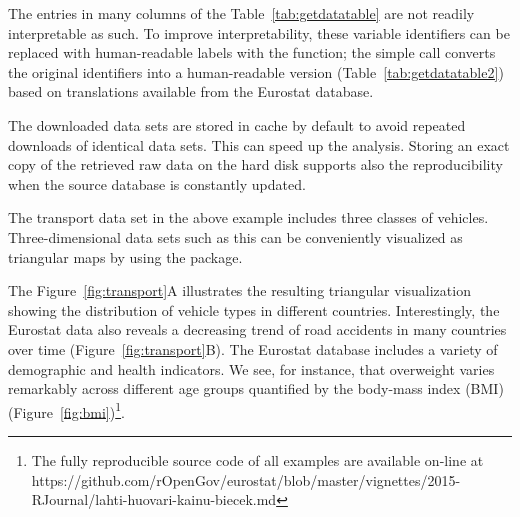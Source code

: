 The entries in many columns of the Table~\ref{tab:getdatatable} are
not readily interpretable as such. To improve interpretability, these
variable identifiers can be replaced with human-readable labels with
the  function; the simple
call  converts the original identifiers
into a human-readable version (Table~\ref{tab:getdatatable2}) based on
translations available from the Eurostat database.

The downloaded data sets are stored in cache by default to avoid
repeated downloads of identical data sets. This can speed up the
analysis. Storing an exact copy of the retrieved raw data on the hard
disk supports also the reproducibility when the source database is
constantly updated.

The transport data set in the above example includes three classes of
vehicles. Three-dimensional data sets such as this can be conveniently
visualized as triangular maps by using
the  \citep{plotrix} package.


The Figure~\ref{fig:transport}A illustrates the resulting triangular 
visualization showing the distribution of vehicle types in different
countries. Interestingly, the Eurostat data also reveals a decreasing
trend of road accidents in many countries over time
(Figure~\ref{fig:transport}B). The Eurostat database includes a
variety of demographic and health indicators. We see, for instance,
that overweight varies remarkably across different age groups
quantified by the body-mass index (BMI)
(Figure~\ref{fig:bmi})\footnote{The fully reproducible source code of
all examples are available on-line at
https://github.com/rOpenGov/eurostat/blob/master/vignettes/2015-RJournal/lahti-huovari-kainu-biecek.md}.


